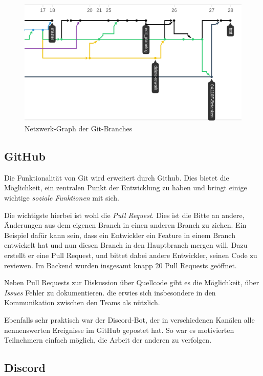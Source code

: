 \documentclass[a4paper, 11pt]{article}
\begin{document}
\begin{figure}[htpb]
    \centering
    \includegraphics[width=\textwidth]{images/git_network.png}
    \caption{Netzwerk-Graph der Git-Branches}
    \label{fig:git_network}
\end{figure}

\subsection{GitHub}

Die Funktionalität von Git wird erweitert durch Github. Dies bietet die
Möglichkeit, ein zentralen Punkt der Entwicklung zu haben und bringt einige
wichtige \emph{soziale Funktionen} mit sich.

Die wichtigste hierbei ist wohl die \emph{Pull Request}. Dies ist die Bitte an
andere, Änderungen aus dem eigenen Branch in einen anderen Branch zu ziehen.
Ein Beispiel dafür kann sein, dass ein Entwickler ein Feature in einem Branch
entwickelt hat und nun diesen Branch in den Hauptbranch mergen will. Dazu
erstellt er eine Pull Request, und bittet dabei andere Entwickler, seinen Code
zu reviewen. Im Backend wurden insgesamt knapp 20 Pull Requests geöffnet.
 
Neben Pull Requests zur Diskussion über Quellcode gibt es die Möglichkeit, über
\emph{Issues} Fehler zu dokumentieren. die erwies sich insbesondere in den
Kommunikation zwischen den Teams als nützlich.

Ebenfalls sehr praktisch war der Discord-Bot, der in verschiedenen Kanälen alle nennenswerten Ereignisse im GitHub gepostet hat. So war es motivierten Teilnehmern einfach möglich, die Arbeit der anderen zu verfolgen.

\subsection{Discord}
\end{document}

